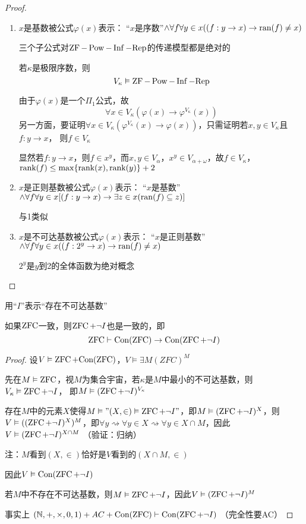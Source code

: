 \documentclass[11pt]{article}
\def \Rep {\text{Rep}}
\begin{document}
\begin{proof}
\begin{enumerate}
\item \(x\)是基数被公式\(\varphi(x)\)表示：
“\(x\)是序数”\(\wedge\forall f\forall y\in x((f:y\to x)\to\operatorname{ran}(f)\neq x)\)

三个子公式对\(\ZF-\Pow-\Inf-\Rep\)的传递模型都是绝对的

若\(\kappa\)是极限序数，则
\begin{equation*}
V_\kappa\vDash\ZF-\Pow-\Inf-\Rep
\end{equation*}

由于\(\varphi(x)\)是一个\(\Pi_1\)公式，故
\begin{equation*}
\forall x\in V_\kappa(\varphi(x)\to\varphi^{V_\kappa}(x))
\end{equation*}
另一方面，要证明\(\forall x\in V_\kappa(\varphi^{V_\kappa}(x)\to\varphi(x))\)，只需证明若\(x,y\in V_\kappa\)且\(f:y\to x\)，
则\(f\in V_\kappa\)

显然若\(f:y\to x\)，则\(f\in x^y\)，而\(x,y\in V_\alpha\)，\(x^y\in V_{\alpha+\omega}\)，故\(f\in V_\kappa\)，
\(\text{rank}(f)\le\max\{\text{rank}(x),\text{rank}(y)\}+2\)
\item \(x\)是正则基数被公式\(\varphi(x)\)表示：
“\(x\)是基数”\(\wedge\forall f\forall y\in x[(f:y\to x)\to\exists z\in x(\operatorname{ran}(f)\subseteq z)]\)

与1类似
\item \(x\)是不可达基数被公式\(\varphi(x)\)表示：
“\(x\)是正则基数”\(\wedge\forall f\forall y\in x((f:2^y\to x)\to\operatorname{ran}(f)\neq x)\)

\(2^y\)是\(y\)到2的全体函数为绝对概念
\end{enumerate}
\end{proof}

用“\(I\)”表示“存在不可达基数”

\begin{lemma}[]
如果\(\operatorname{ZFC}\)一致，则\(\operatorname{ZFC}+\neg I\)也是一致的，即
\begin{equation*}
\operatorname{ZFC}\vdash\text{Con}(\operatorname{ZFC})\to\text{Con}(\operatorname{ZFC}+\neg I)
\end{equation*}
\end{lemma}

\begin{proof}
设\(V\vDash\operatorname{ZFC}+\text{Con}(\operatorname{ZFC})\)，\(V\vDash\exists M(ZFC)^M\)

先在\(M\vDash\operatorname{ZFC}\)，视\(M\)为集合宇宙，若\(\kappa\)是\(M\)中最小的不可达基数，则\(V_\kappa\vDash\operatorname{ZFC}+\neg I\)，
即\(M\vDash(\operatorname{ZFC}+\neg I)^{V_\kappa}\)

存在\(M\)中的元素\(X\)使得\(M\vDash"(X,\in)\vDash\operatorname{ZFC}+\neg I"\)，即\(M\vDash(\operatorname{ZFC}+\neg I)^X\)，则
\(V\vDash((\operatorname{ZFC}+\neg I)^X)^M\)，即\(\forall y\rightsquigarrow\forall y\in X\rightsquigarrow\forall y\in X\cap M\)，因此
\(V\vDash(\operatorname{ZFC}+\neg I)^{X\cap M}\) （验证：归纳）

注：\(M\)看到\((X,\in)\)恰好是\(V\)看到的\((X\cap M,\in)\)

因此\(V\vDash\text{Con}(\operatorname{ZFC}+\neg I)\)

若\(M\)中不存在不可达基数，则\(M\vDash\operatorname{ZFC}+\neg I\)，因此\(V\vDash(\operatorname{ZFC}+\neg I)^M\)

事实上
\((\mathbb{N},+,\times,0,1)+AC+\text{Con}(\operatorname{ZFC})\vdash\text{Con}(\operatorname{ZFC}+\neg I)\)
（完全性要AC）
\end{proof}
\end{document}
